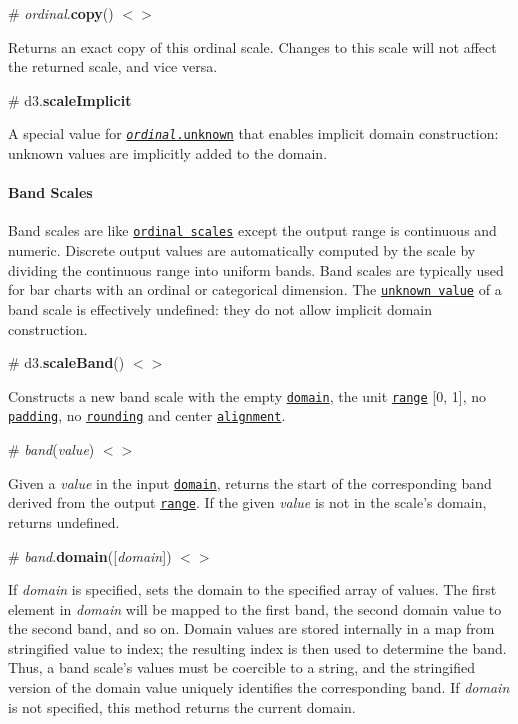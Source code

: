 \label{_ordinal_copy}%
\# {\itshape ordinal}.{\bfseries copy}() \href{https://github.com/d3/d3-scale/blob/master/src/ordinal.js#L38}{\tt $<$$>$}

Returns an exact copy of this ordinal scale. Changes to this scale will not affect the returned scale, and vice versa.

\label{_scaleImplicit}%
\# d3.{\bfseries scale\+Implicit}

A special value for \href{#ordinal_unknown}{\tt {\itshape ordinal}.unknown} that enables implicit domain construction\+: unknown values are implicitly added to the domain.

\paragraph*{Band Scales}

Band scales are like \href{#ordinal-scales}{\tt ordinal scales} except the output range is continuous and numeric. Discrete output values are automatically computed by the scale by dividing the continuous range into uniform bands. Band scales are typically used for bar charts with an ordinal or categorical dimension. The \href{#ordinal_unknown}{\tt unknown value} of a band scale is effectively undefined\+: they do not allow implicit domain construction.



\label{_scaleBand}%
\# d3.{\bfseries scale\+Band}() \href{https://github.com/d3/d3-scale/blob/master/src/band.js}{\tt $<$$>$}

Constructs a new band scale with the empty \href{#band_domain}{\tt domain}, the unit \href{#band_range}{\tt range} \mbox{[}0, 1\mbox{]}, no \href{#band_padding}{\tt padding}, no \href{#band_round}{\tt rounding} and center \href{#band_align}{\tt alignment}.

\label{__band}%
\# {\itshape band}({\itshape value}) \href{https://github.com/d3/d3-scale/blob/master/src/band.js#L4}{\tt $<$$>$}

Given a {\itshape value} in the input \href{#band_domain}{\tt domain}, returns the start of the corresponding band derived from the output \href{#band_range}{\tt range}. If the given {\itshape value} is not in the scale’s domain, returns undefined.

\label{_band_domain}%
\# {\itshape band}.{\bfseries domain}(\mbox{[}{\itshape domain}\mbox{]}) \href{https://github.com/d3/d3-scale/blob/master/src/band.js#L32}{\tt $<$$>$}

If {\itshape domain} is specified, sets the domain to the specified array of values. The first element in {\itshape domain} will be mapped to the first band, the second domain value to the second band, and so on. Domain values are stored internally in a map from stringified value to index; the resulting index is then used to determine the band. Thus, a band scale’s values must be coercible to a string, and the stringified version of the domain value uniquely identifies the corresponding band. If {\itshape domain} is not specified, this method returns the current domain.

